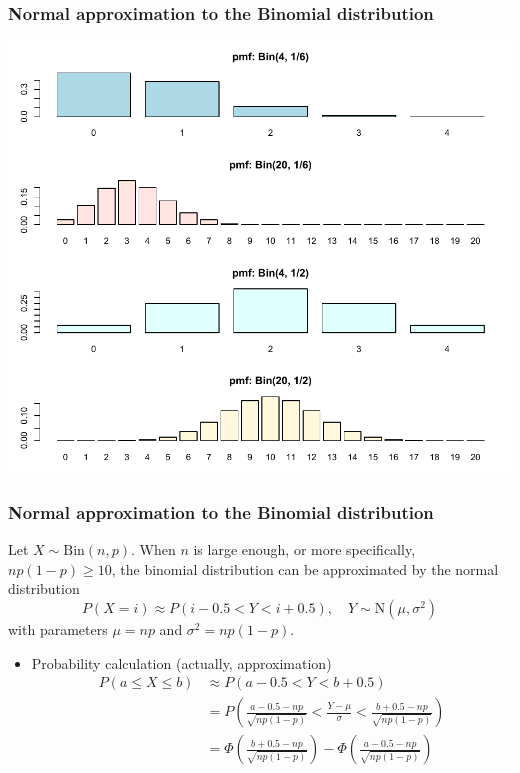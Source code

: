 \documentclass[slidestop,compress,mathserif]{beamer}
\begin{document}
\begin{frame}
\frametitle{Normal approximation to the Binomial distribution}

\vspace{-0.5cm}
\begin{center}
\includegraphics[scale = 0.6]{figures/pmf2}
\end{center}

\end{frame}



\begin{frame}
\frametitle{Normal approximation to the Binomial distribution}

Let $X \sim \text{Bin}(n, p)$.
When $n$ is large enough, or more specifically, $np (1-p) \geq 10$,
the binomial distribution can be approximated by the normal distribution
\[ P(X = i) \approx P(i - 0.5 < Y < i + 0.5), \quad Y \sim \text{N}(\mu, \sigma^2) \]
with parameters $\mu = np$ and $\sigma^2 = np(1-p)$.

\begin{itemize}
\item Probability calculation (actually, approximation)
\begin{align*}
P(a \leq X \leq b) &\approx P(a - 0.5 < Y < b + 0.5) \\
& = P\left( \frac{a - 0.5 - np}{\sqrt{np(1-p)}} < \frac{Y - \mu}{\sigma} < \frac{b + 0.5 - np}{\sqrt{np(1-p)}} \right)\\
& = \Phi\left( \frac{b + 0.5 - np}{\sqrt{np(1-p)}} \right) -  \Phi\left( \frac{a - 0.5 - np}{\sqrt{np(1-p)}} \right)
\end{align*}



\end{itemize}

\end{frame}
\end{document}
